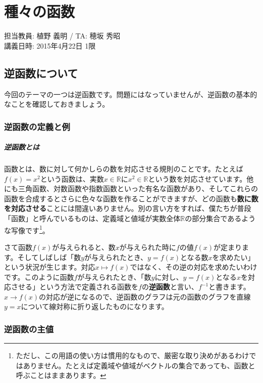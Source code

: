 \chapter{種々の函数}

\begin{flushright}
担当教員: 植野 義明 / TA: 穂坂 秀昭 \\
講義日時: 2015年4月22日 1限
\end{flushright}

\section{逆函数について}

今回のテーマの一つは逆函数です。問題にはなっていませんが、逆函数の基本的なことを確認しておきましょう。

\subsection{逆函数の定義と例}

\paragraph{逆函数とは}
函数とは、数に対して何かしらの数を対応させる規則のことです。たとえば$f(x)=x^2$という函数は、実数$x\in\mathbb{R}$に$x^2\in\mathbb{R}$という数を対応させています。他にも三角函数、対数函数や指数函数といった有名な函数があり、そしてこれらの函数を合成するとさらに色々な函数を作ることができますが、どの函数も\textbf{数に数を対応させる}ことには間違いありません。別の言い方をすれば、僕たちが普段「函数」と呼んでいるものは、定義域と値域が実数全体$\mathbb{R}$の部分集合であるような写像です\footnote{ただし、この用語の使い方は慣用的なもので、厳密な取り決めがあるわけではありません。たとえば定義域や値域がベクトルの集合であっても、函数と呼ぶことはままあります。}。

さて函数$f(x)$が与えられると、数$x$が与えられた時に$f$の値$f(x)$が定まります。そしてしばしば「数$y$が与えられたとき、$y=f(x)$となる数$x$を求めたい」という状況が生じます。対応$x\mapsto f(x)$ではなく、その逆の対応を求めたいわけです。このように函数$f$が与えられたとき、「数$y$に対し、$y=f(x)$となる$x$を対応させる」という方法で定義される函数を$f$の\textbf{逆函数}と言い、$f^{-1}$と書きます。$x\rightarrow f(x)$の対応が逆になるので、逆函数のグラフは元の函数のグラフを直線$y=x$について線対称に折り返したものになります。

\subsection{逆函数の主値}

